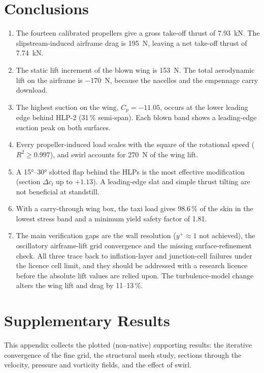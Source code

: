 \documentclass[10pt,a4paper]{article}
\begin{document}
\section{Conclusions}
\label{sec:conclusions}
\begin{enumerate}[leftmargin=1.5em,itemsep=2pt,topsep=2pt]
  \item The fourteen calibrated propellers give a gross take-off thrust of \SI{7.93}{kN}. The slipstream-induced
        airframe drag is \SI{195}{N}, leaving a net take-off thrust of \SI{7.74}{kN}.
  \item The static lift increment of the blown wing is \SI{+153}{N}. The total aerodynamic lift on the airframe is
        \SI{-170}{N}, because the nacelles and the empennage carry download.
  \item The highest suction on the wing, $C_p=-11.05$, occurs at the lower leading edge behind HLP-2 (31\,\% semi-span).
        Each blown band shows a leading-edge suction peak on both surfaces.
  \item Every propeller-induced load scales with the square of the rotational speed ($R^2\geq0.997$), and swirl
        accounts for \SI{270}{N} of the wing lift.
  \item A \ang{15}--\ang{30} slotted flap behind the HLPs is the most effective modification (section $\Delta c_l$ up to
        $+1.13$). A leading-edge slat and simple thrust tilting are not beneficial at standstill.
  \item With a carry-through wing box, the taxi load gives 98.6\,\% of the skin in the lowest stress band and a
        minimum yield safety factor of 1.81.
  \item The main verification gaps are the wall resolution ($y^+\approx1$ not achieved), the oscillatory airframe-lift
        grid convergence and the missing surface-refinement check. All three trace back to inflation-layer and
        junction-cell failures under the licence cell limit, and they should be addressed with a research licence
        before the absolute lift values are relied upon. The turbulence-model change alters the wing lift and drag
        by 11--13\,\%.
\end{enumerate}




\appendix
\section{Supplementary Results}
\label{app:extra}
This appendix collects the plotted (non-native) supporting results: the iterative convergence of the fine grid,
the structural mesh study, sections through the velocity, pressure and vorticity fields, and the effect of swirl.
\end{document}
